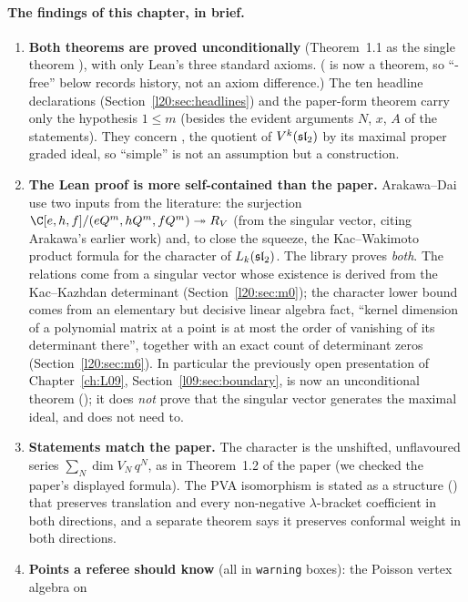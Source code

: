 \paragraph{The findings of this chapter, in brief.}
\begin{enumerate}
\item \textbf{Both theorems are proved unconditionally} (Theorem~1.1 as the single theorem
  ), with only Lean's
  three standard axioms. ( is now a theorem, so ``-free'' below records history, not an axiom
  difference.) The ten headline
  declarations (Section~\ref{l20:sec:headlines}) and the paper-form theorem carry only the hypothesis $1\le m$ (besides the
  evident arguments $N$, $x$, $A$ of the statements). They concern
  , the quotient of $V^k(\mathfrak{sl}_2)$ by its maximal proper
  graded ideal, so ``simple'' is not an assumption but a construction.
\item \textbf{The Lean proof is more self-contained than the paper.} Arakawa--Dai use two inputs from
  the literature: the surjection $\C[e,h,f]/(e\ltwentyQ^m,h\ltwentyQ^m,f\ltwentyQ^m)\twoheadrightarrow R_V$
  (from the singular vector, citing Arakawa's earlier work) and, to close the squeeze, the
  Kac--Wakimoto product formula for the character of $L_k(\mathfrak{sl}_2)$. The library proves \emph{both}.
  The relations come from a singular vector whose existence is derived from the Kac--Kazhdan determinant
  (Section~\ref{l20:sec:m0}); the character lower bound comes from an elementary but decisive linear
  algebra fact, ``kernel dimension of a polynomial matrix at a point is at most the order of vanishing of
  its determinant there'', together with an exact count of determinant zeros (Section~\ref{l20:sec:m6}).
  In particular the previously open presentation of Chapter~\ref{ch:L09}, Section~\ref{l09:sec:boundary},
  is now an unconditional theorem (); it does \emph{not} prove that the singular
  vector generates the maximal ideal, and does not need to.
\item \textbf{Statements match the paper.} The character is the unshifted, unflavoured series
  $\sum_N\dim V_N\,q^N$, as in Theorem~1.2 of the paper (we checked the paper's displayed formula). The
  PVA isomorphism is stated as a structure () that preserves translation
  and every non-negative $\lambda$-bracket coefficient in both directions, and a separate theorem says it
  preserves conformal weight in both directions.
\item \textbf{Points a referee should know} (all in \texttt{warning} boxes): the Poisson vertex algebra on

\end{enumerate}
